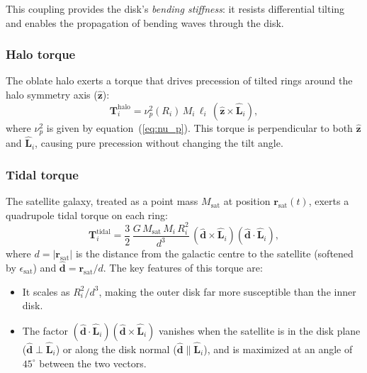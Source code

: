 This coupling provides the disk's \emph{bending stiffness}: it resists differential tilting and enables the propagation of bending waves through the disk.

\subsubsection{Halo torque}

The oblate halo exerts a torque that drives precession of tilted rings around the halo symmetry axis ($\hat{\boldsymbol{z}}$):
\begin{equation}
    \boldsymbol{T}_i^\mathrm{halo} = \nu_p^2(R_i)\,M_i\,\ell_i\,\left(\hat{\boldsymbol{z}} \times \hat{\boldsymbol{L}}_i\right),
    \label{eq:T_halo}
\end{equation}
where $\nu_p^2$ is given by equation~(\ref{eq:nu_p}). This torque is perpendicular to both $\hat{\boldsymbol{z}}$ and $\hat{\boldsymbol{L}}_i$, causing pure precession without changing the tilt angle.

\subsubsection{Tidal torque}
\label{sec:tidal_torque}

The satellite galaxy, treated as a point mass $M_\mathrm{sat}$ at position $\boldsymbol{r}_\mathrm{sat}(t)$, exerts a quadrupole tidal torque on each ring:
\begin{equation}
    \boldsymbol{T}_i^\mathrm{tidal} = \frac{3}{2}\,\frac{G\,M_\mathrm{sat}\,M_i\,R_i^2}{d^3}\,\left(\hat{\boldsymbol{d}} \times \hat{\boldsymbol{L}}_i\right)\left(\hat{\boldsymbol{d}} \cdot \hat{\boldsymbol{L}}_i\right),
    \label{eq:T_tidal}
\end{equation}
where $d = |\boldsymbol{r}_\mathrm{sat}|$ is the distance from the galactic centre to the satellite (softened by $\epsilon_\mathrm{sat}$) and $\hat{\boldsymbol{d}} = \boldsymbol{r}_\mathrm{sat}/d$. The key features of this torque are:
\begin{itemize}
    \item It scales as $R_i^2/d^3$, making the outer disk far more susceptible than the inner disk.
    \item The factor $(\hat{\boldsymbol{d}}\cdot\hat{\boldsymbol{L}}_i)(\hat{\boldsymbol{d}}\times\hat{\boldsymbol{L}}_i)$ vanishes when the satellite is in the disk plane ($\hat{\boldsymbol{d}}\perp\hat{\boldsymbol{L}}_i$) or along the disk normal ($\hat{\boldsymbol{d}}\parallel\hat{\boldsymbol{L}}_i$), and is maximized at an angle of $45^\circ$ between the two vectors.
\end{itemize}

